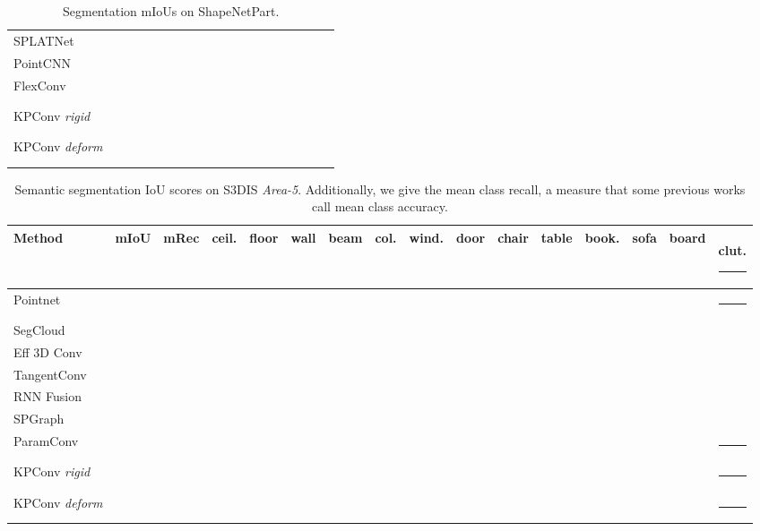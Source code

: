 \documentclass[10pt,twocolumn,letterpaper]{article}
\newcommand\Tstrut{\rule{-3pt}{2.6ex}}       \newcommand\Bstrut{\rule[-0.9ex]{-3pt}{0pt}} \newcommand{\TBstrut}{\rule{-3pt}{2.6ex} \rule[-0.9ex]{-2pt}{0pt}}
\begin{document}
\begin{table*}[b]
\begin{small}
\begin{center}
\begin{tabular}{L{2.5cm} | C{0.9cm} | C{0.9cm} | *{16}{C{0.75cm}}}
SPLATNet \cite{su2018splatnet}	& 	& 	& 	& 	& 	& 	& 	& 	& 	& 	& 	& 	& 	& 	& 	& 	& 	& 	\\
PointCNN \cite{li2018pointcnn}	& 	& 	& 	& 	& 	& 	& 	& 	& 	& 	& 	& 	& 	& 	& 	& 	& 	& 	\\
FlexConv \cite{groh2018flex}	& 	& 	& 	& 	& 	& 	& 	& 	& 	& 	& 	& 	& 	& 	& 	& 	& 	& 	\Bstrut\\
\hline
KPConv \textit{rigid}	& 	& 	& 	& 	& 	& 	& 	& 	& 	& 	& 	& 	& 	& 	& 	& 	& 	& 	\Tstrut\\
KPConv \textit{deform}	& 	& 	& 	& 	& 	& 	& 	& 	& 	& 	& 	& 	& 	& 	& 	& 	& 	& 	\Bstrut\\
\hline
\end{tabular}
\end{center}
\end{small}
\caption{Segmentation mIoUs on ShapeNetPart.}
\label{Table_ShapeNetPart} 
\end{table*}


\begin{table*}[b]
\setlength\tabcolsep{0.5pt}
\begin{small}
\begin{center}
\begin{tabular}{L{2.4cm} | C{1.0cm} | C{1.0cm} | *{13}{C{0.9cm}}}
Method	 & mIoU & mRec & ceil.	 & floor	 & wall	 & beam	 & col.	 & wind.	 & door	 & chair	 & table	 & book.	 & sofa	 & board & clut.	\Bstrut\\
\hline
Pointnet \cite{qi2017pointnet}	& 	& 	& 	& 	& 	& 	& 	& 	& 	& 	& 	& 	& 	& 	& 	\Tstrut\\
SegCloud \cite{tchapmi2017segcloud}	& 	& 	& 	& 	& 	& 	& 	& 	& 	& 	& 	& 	& 	& 	& 	\\
Eff 3D Conv \cite{zhang2018efficient}	& 	& 	& 	& 	& 	& 	& 	& 	& 	& 	& 	& 	& 	& 	& 	\\
TangentConv \cite{tatarchenko2018tangent}	& 	& 	& 	& 	& 	& 	& 	& 	& 	& 	& 	& 	& 	& 	& 	\\
RNN Fusion \cite{ye20183d}	& 	& 	& 	& 	& 	& 	& 	& 	& 	& 	& 	& 	& 	& 	& 	\\
SPGraph \cite{landrieu2018large}	& 	& 	& 	& 	& 	& 	& 	& 	& 	& 	& 	& 	& 	& 	& 	\\
ParamConv \cite{wang2018deep}	& 	& 	& 	& 	& 	& 	& 	& 	& 	& 	& 	& 	& 	& 	& 	\Bstrut\\
\hline
KPConv \textit{rigid}	& 	& 	& 	& 	& 	& 	& 	& 	& 	& 	& 	& 	& 	& 	& 	\Tstrut\\
KPConv \textit{deform}	& 	& 	& 	& 	& 	& 	& 	& 	& 	& 	& 	& 	& 	& 	& 	\Bstrut\\
\hline
\end{tabular}
\end{center}
\end{small}
\caption{Semantic segmentation IoU scores on S3DIS \textit{Area-5}. Additionally, we give the mean class recall, a measure that some previous works call mean class accuracy.}
\label{Table_S3DIS_area5} 
\end{table*}
\end{document}

